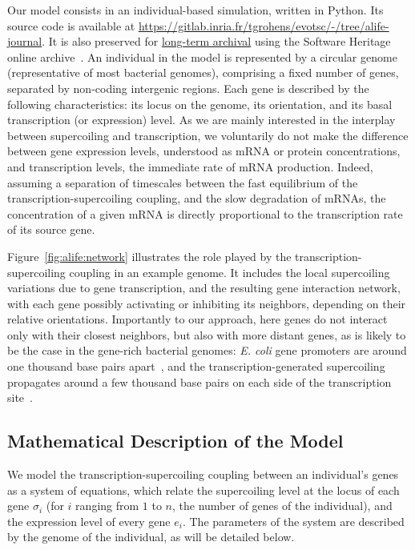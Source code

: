 Our model consists in an individual-based simulation, written in Python.
Its source code is available at \url{https://gitlab.inria.fr/tgrohens/evotsc/-/tree/alife-journal}.
It is also preserved for \href{https://archive.softwareheritage.org/swh:1:rev:6fc36abc1661c295782886647c37ef05ffb9d357}{long-term archival} using the Software Heritage online archive~\citep{dicosmo2020}.
An individual in the model is represented by a circular genome (representative of most bacterial genomes), comprising a fixed number of genes, separated by non-coding intergenic regions.
Each gene is described by the following characteristics: its locus on the genome, its orientation, and its basal transcription (or expression) level.
As we are mainly interested in the interplay between supercoiling and transcription, we voluntarily do not make the difference between gene expression levels, understood as mRNA or protein concentrations, and transcription levels, the immediate rate of mRNA
production.
Indeed, assuming a separation of timescales between the fast equilibrium of the transcription-supercoiling coupling, and the slow degradation of mRNAs, the concentration of a given mRNA is directly proportional to the transcription rate of its source gene.

Figure~\ref{fig:alife:network} illustrates the role played by the transcription-supercoiling coupling in an example genome.
It includes the local supercoiling variations due to gene transcription, and the resulting gene interaction network, with each gene possibly activating or inhibiting its neighbors, depending on their relative orientations.
Importantly to our approach, here genes do not interact only with their closest neighbors, but also with more distant genes, as is likely to be the case in the gene-rich bacterial genomes: \emph{E. coli} gene promoters are around one thousand base pairs apart~\citep{peter2004}, and the transcription-generated supercoiling propagates around a few thousand base pairs on each side of the transcription site~\citep{postow2004}.


\subsection{Mathematical Description of the Model}

We model the transcription-supercoiling coupling between an individual's genes as a system of equations, which relate the supercoiling level at the locus of each gene $\sigma_i$ (for $i$ ranging from $1$ to $n$, the number of genes of the individual), and the expression level of every gene $e_i$.
The parameters of the system are described by the genome of the individual, as will be detailed below.

